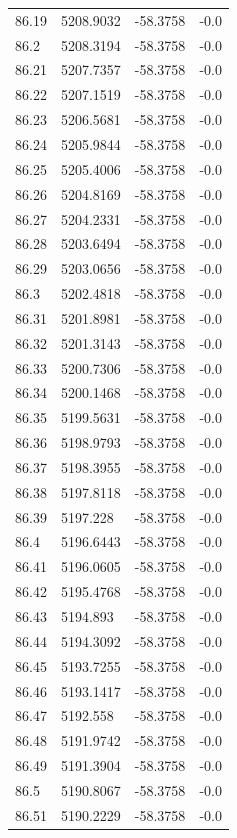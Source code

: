 \begin{table}[H]
\begin{tabular}{llll}
86.19 & 5208.9032 & -58.3758 & -0.0 \\
86.2 & 5208.3194 & -58.3758 & -0.0 \\
86.21 & 5207.7357 & -58.3758 & -0.0 \\
86.22 & 5207.1519 & -58.3758 & -0.0 \\
86.23 & 5206.5681 & -58.3758 & -0.0 \\
86.24 & 5205.9844 & -58.3758 & -0.0 \\
86.25 & 5205.4006 & -58.3758 & -0.0 \\
86.26 & 5204.8169 & -58.3758 & -0.0 \\
86.27 & 5204.2331 & -58.3758 & -0.0 \\
86.28 & 5203.6494 & -58.3758 & -0.0 \\
86.29 & 5203.0656 & -58.3758 & -0.0 \\
86.3 & 5202.4818 & -58.3758 & -0.0 \\
86.31 & 5201.8981 & -58.3758 & -0.0 \\
86.32 & 5201.3143 & -58.3758 & -0.0 \\
86.33 & 5200.7306 & -58.3758 & -0.0 \\
86.34 & 5200.1468 & -58.3758 & -0.0 \\
86.35 & 5199.5631 & -58.3758 & -0.0 \\
86.36 & 5198.9793 & -58.3758 & -0.0 \\
86.37 & 5198.3955 & -58.3758 & -0.0 \\
86.38 & 5197.8118 & -58.3758 & -0.0 \\
86.39 & 5197.228 & -58.3758 & -0.0 \\
86.4 & 5196.6443 & -58.3758 & -0.0 \\
86.41 & 5196.0605 & -58.3758 & -0.0 \\
86.42 & 5195.4768 & -58.3758 & -0.0 \\
86.43 & 5194.893 & -58.3758 & -0.0 \\
86.44 & 5194.3092 & -58.3758 & -0.0 \\
86.45 & 5193.7255 & -58.3758 & -0.0 \\
86.46 & 5193.1417 & -58.3758 & -0.0 \\
86.47 & 5192.558 & -58.3758 & -0.0 \\
86.48 & 5191.9742 & -58.3758 & -0.0 \\
86.49 & 5191.3904 & -58.3758 & -0.0 \\
86.5 & 5190.8067 & -58.3758 & -0.0 \\
86.51 & 5190.2229 & -58.3758 & -0.0 \\

\end{tabular}
\end{table}
